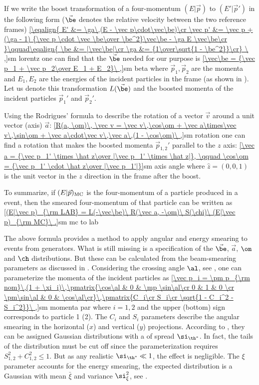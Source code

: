 If we write the boost transformation of a four-momentum $(E|\vec p)$ to $(E'|\vec p')$ in the following form ($\vec\be$ denotes the relative velocity between the two reference frames)
\eqref{\eqalign{
E'      &= \ga\,(E - \vec p\cdot\vec\be)\cr
\vec p' &= \vec p  +  (\ga - 1) {\vec p \cdot \vec \be\over \be^2}\vec\be - \ga E \vec\be\cr
}\qquad\eqalign{
\be &= |\vec\be|\cr
\ga &= {1\over\sqrt{1 - \be^2}}\cr}
\ ,}{sm lorentz}
one can find that the $\vec\be$ needed for our purpose is
\eqref{\vec\be = {\vec p_1 + \vec p_2\over E_1 + E_2}\ ,}{sm beta}
where $\vec p_1, \vec p_2$ are the momenta and $E_1, E_2$ are the energies of the incident particles in the  frame (as shown in ). Let us denote this transformation $L(\vec\be)$ and the boosted momenta of the incident particles $\vec p_1'$ and $\vec p_2'$.

Using the Rodrigues' formula to describe the rotation of a vector $\vec v$ around a unit vector (axis) $\vec a$:
\eqref{R(a, \om)\, \vec v = \vec v\,\cos\om + \vec a\times\vec v\,\sin\om + \vec a\cdot\vec v\,\vec a\,(1 - \cos\om)\ ,}{sm rotation}
one can find a rotation that makes the boosted momenta $\vec p_{1, 2}'$ parallel to the $z$ axis:
\eqref{\vec a = {\vec p_1' \times \hat z\over |\vec p_1' \times \hat z|}, \qquad \cos\om = {\vec p_1' \cdot \hat z\over |\vec p_1'|}}{sm axis angle}
where $\hat z = (0, 0, 1)$ is the unit vector in the $z$ direction in the frame after the boost.

To summarize, if $(E|\vec p)_{\rm MC}$ is the four-momentum of a particle produced in a  event, then the smeared  four-momentum of that particle can be written as
\eqref{(E|\vec p)_{\rm LAB} = L(-\vec\be)\ R(\vec a, -\om)\ S(\chi)\ (E|\vec p)_{\rm MC}\ .}{sm mc to lab}


The above formula provides a method to apply angular and energy smearing to events from  generators. What is still missing is a specification of the $\vec\be$, $\vec a$, $\om$ and $\ch$ distributions. But these can be calculated from the beam-smearing parameters as discussed in . Considering the crossing angle $\al$, see , one can parameterize the momenta of the incident particles as
\eqref{\vec p_i = \pm p_{\rm nom}\,(1 + \xi_i)\,\pmatrix{\cos\al & 0 & \mp \sin\al\cr 0 & 1 & 0 \cr \pm\sin\al & 0 & \cos\al\cr}\,\pmatrix{C_i\cr S_i\cr \sqrt{1 - C_i^2 - S_i^2}}\ ,}{sm momenta par}
where $i = 1, 2$ and the upper (bottom) sign corresponds to particle 1 (2). The $C_i$ and $S_i$ parameters describe the angular smearing in the horizontal ($x$) and vertical ($y$) projections. According to , they can be assigned Gaussian distributions
with a of spread $\si_{\th^*}$. In fact, the tails of the distribution must be cut off since the parameterization requires $S_{1,2}^2 + C_{1,2}^2 \leq 1$. But as any realistic $\si_{\th^*} \ll 1$, the effect is negligible. The $\xi$ parameter accounts for the energy smearing, the expected distribution is a Gaussian with mean $\bar\xi$ and variance $\si_\xi^2$, see .

